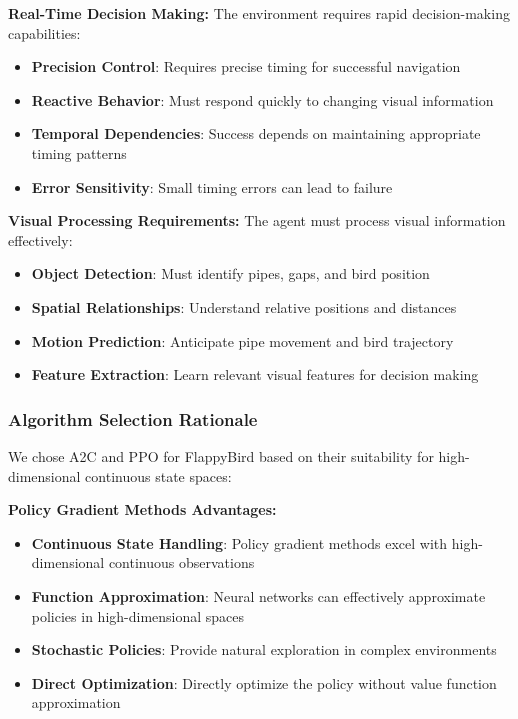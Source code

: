 \documentclass[12pt]{article}
\begin{document}
{{{\textbf{Real-Time Decision Making:}
The environment requires rapid decision-making capabilities:

\begin{itemize}
    \item \textbf{Precision Control}: Requires precise timing for successful navigation
    \item \textbf{Reactive Behavior}: Must respond quickly to changing visual information
    \item \textbf{Temporal Dependencies}: Success depends on maintaining appropriate timing patterns
    \item \textbf{Error Sensitivity}: Small timing errors can lead to failure
\end{itemize}

\textbf{Visual Processing Requirements:}
The agent must process visual information effectively:

\begin{itemize}
    \item \textbf{Object Detection}: Must identify pipes, gaps, and bird position
    \item \textbf{Spatial Relationships}: Understand relative positions and distances
    \item \textbf{Motion Prediction}: Anticipate pipe movement and bird trajectory
    \item \textbf{Feature Extraction}: Learn relevant visual features for decision making
\end{itemize}

\subsubsection{Algorithm Selection Rationale}

We chose A2C and PPO for FlappyBird based on their suitability for high-dimensional continuous state spaces:

\textbf{Policy Gradient Methods Advantages:}
\begin{itemize}
    \item \textbf{Continuous State Handling}: Policy gradient methods excel with high-dimensional continuous observations
    \item \textbf{Function Approximation}: Neural networks can effectively approximate policies in high-dimensional spaces
    \item \textbf{Stochastic Policies}: Provide natural exploration in complex environments
    \item \textbf{Direct Optimization}: Directly optimize the policy without value function approximation
\end{itemize}

}}}
\end{document}
